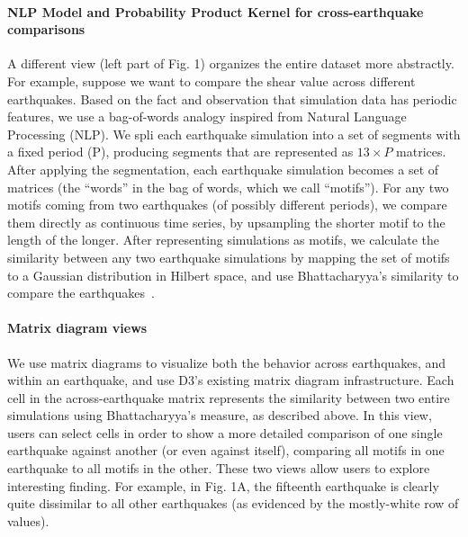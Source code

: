 \paragraph*{NLP Model and Probability Product Kernel for cross-earthquake comparisons}
\label{sec:method}
A different view (left part of Fig. 1) organizes the entire dataset more abstractly. For example, suppose we want to compare the shear value across different earthquakes. Based on the fact and observation that simulation data has periodic features, we use a bag-of-words analogy inspired from Natural Language Processing (NLP). We spli each earthquake simulation into a set of segments with a fixed period (P), producing segments that are represented as  $13 \times P$ matrices. After applying the segmentation, each earthquake simulation becomes a set of matrices (the ``words'' in the bag of words, which we call ``motifs''). For any two motifs coming from two earthquakes (of possibly different periods), we compare them directly as continuous time series, by upsampling the shorter motif to the length of the longer. After representing simulations as motifs, we calculate the similarity between any two earthquake simulations by mapping the set of motifs to a Gaussian distribution in Hilbert space, and use Bhattacharyya's similarity to compare the earthquakes~\cite{conf/icml/KondorJ03}.

\paragraph*{Matrix diagram views}
\label{matrixvis}
We use matrix diagrams to visualize both the behavior across earthquakes, and within an earthquake, and use D3's existing matrix diagram infrastructure. Each cell in the across-earthquake matrix represents the similarity between two entire simulations using Bhattacharyya's measure, as described above. In this view, users can select cells in order to show a more detailed comparison of one single earthquake against another (or even against itself), comparing all motifs in one earthquake to all motifs in the other. These two views allow users to explore interesting finding. For example, in Fig. 1A, the fifteenth earthquake is clearly quite dissimilar to all other earthquakes (as evidenced by the mostly-white row of values).


